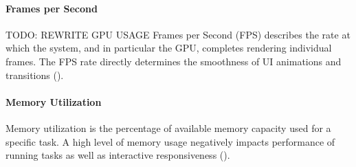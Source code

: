 \paragraph*{Frames per Second}\label{paragraph::fps}\hfill \break
TODO: REWRITE GPU USAGE
Frames per Second (FPS) describes the rate at which the system, and in particular the GPU,
completes rendering individual frames. The FPS rate directly determines the smoothness of UI
animations and transitions (\cite{Google2020}).

\paragraph*{Memory Utilization}\label{paragraph::memory_utilization}\hfill \break
Memory utilization is the percentage of available memory capacity used for a specific task. 
A high level of memory usage negatively impacts performance of running tasks as well as interactive responsiveness (\cite{Ljubuncic2015}).

